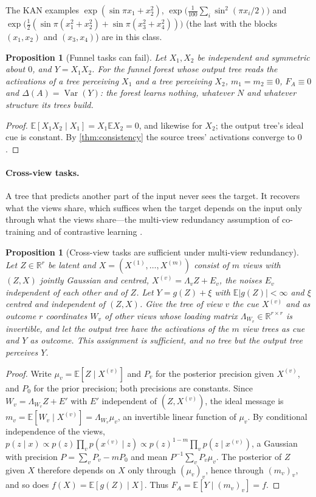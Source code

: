 \documentclass[11pt]{article}
\newtheorem{proposition}[theorem]{Proposition}
\theoremstyle{definition}
\theoremstyle{remark}
\newcommand{\R}{\mathbb{R}}
\newcommand{\E}{\mathbb{E}}
\newcommand{\Var}{\operatorname{Var}}
\begin{document}
The KAN examples $\exp(\sin\pi x_1+x_2^2)$, $\exp\bigl(\tfrac1{100}\sum_i\sin^2(\pi x_i/2)\bigr)$
and $\exp\bigl(\tfrac12(\sin\pi(x_1^2+x_2^2)+\sin\pi(x_3^2+x_4^2))\bigr)$ (the last with
the blocks $(x_1,x_2)$ and $(x_3,x_4)$) are in this class.

\begin{proposition}[Funnel tasks can fail]\label{prop:xy}
Let $X_1,X_2$ be independent and symmetric about $0$, and $Y=X_1X_2$.  For the funnel
forest whose output tree reads the activations of a tree perceiving $X_1$ and a tree
perceiving $X_2$, $m_1=m_2\equiv0$, $F_A\equiv0$ and $\Delta(A)=\Var(Y)$: the forest
learns nothing, whatever $N$ and whatever structure its trees build.
\end{proposition}
\begin{proof}
$\E[X_1X_2\mid X_1]=X_1\E X_2=0$, and likewise for $X_2$; the output tree's ideal cue is
constant.  By \cref{thm:consistency} the source trees' activations converge to $0$.
\end{proof}

\paragraph{Cross-view tasks.}
A tree that predicts another part of the input never sees the target.  It recovers what
the views share, which suffices when the target depends on the input only through what
the views share---the multi-view redundancy assumption of co-training and of
contrastive learning \citep{blum1998,tosh2021}.

\begin{proposition}[Cross-view tasks are sufficient under multi-view redundancy]\label{prop:multiview}
Let $Z\in\R^r$ be latent and $X=(X^{(1)},\dots,X^{(m)})$ consist of $m$ views with
$(Z,X)$ jointly Gaussian and centred, $X^{(v)}=\Lambda_vZ+E_v$, the noises $E_v$
independent of each other and of $Z$.  Let $Y=g(Z)+\xi$ with $\E|g(Z)|<\infty$ and $\xi$
centred and independent of $(Z,X)$.  Give the tree of view $v$ the cue $X^{(v)}$ and as
outcome $r$ coordinates $W_v$ of other views whose loading matrix $\Lambda_{W_v}\in\R^{r\times r}$
is invertible, and let the output tree have the activations of the $m$ view trees as cue
and $Y$ as outcome.  This assignment is sufficient, and no tree but the output tree
perceives $Y$.
\end{proposition}
\begin{proof}
Write $\mu_v=\E[Z\mid X^{(v)}]$ and $P_v$ for the posterior precision given $X^{(v)}$, and
$P_0$ for the prior precision; both precisions are constants.  Since $W_v=\Lambda_{W_v}Z+E'$
with $E'$ independent of $(Z,X^{(v)})$, the ideal message is
$m_v=\E[W_v\mid X^{(v)}]=\Lambda_{W_v}\mu_v$, an invertible linear function of $\mu_v$.
By conditional independence of the views,
$p(z\mid x)\propto p(z)\prod_vp(x^{(v)}\mid z)\propto p(z)^{1-m}\prod_vp(z\mid x^{(v)})$,
a Gaussian with precision $P=\sum_vP_v-mP_0$ and mean $P^{-1}\sum_vP_v\mu_v$.  The
posterior of $Z$ given $X$ therefore depends on $X$ only through $(\mu_v)_v$, hence through
$(m_v)_v$, and so does $f(X)=\E[g(Z)\mid X]$.  Thus $F_A=\E[Y\mid(m_v)_v]=f$.
\end{proof}
\end{document}
